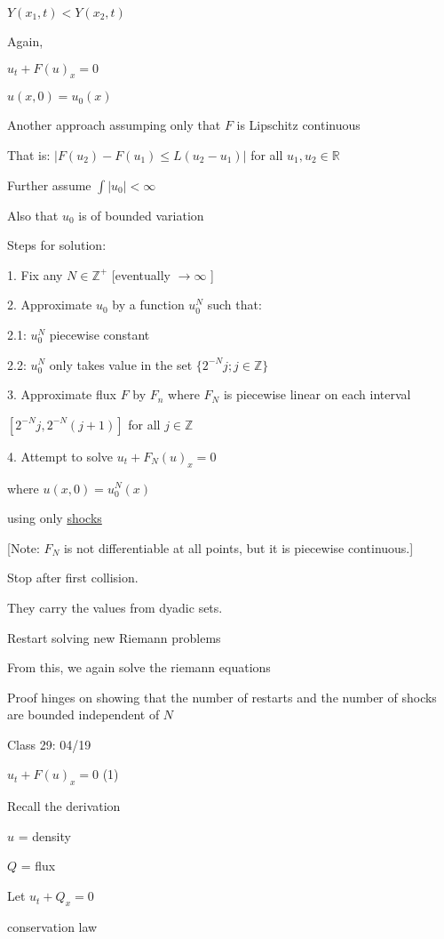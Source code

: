 \documentclass{article}
\theoremstyle{definition}
\begin{document}
\(Y(x_1,t) < Y(x_2,t)\) 

Again,

\(u_t + F(u)_x = 0\) 

\(u(x,0)=u_0(x)\) 

Another approach assumping only that \(F\) is Lipschitz continuous

That is: \(\vert F(u_2) - F(u_1) \leq L(u_2 - u_1) \vert \) for all \(u_1, u_2\in\mathbb{R}\) 

Further assume \(\int \vert u_0 \vert < \infty\) 

Also that \(u_0\) is of bounded variation

Steps for solution:

1. Fix any \(N\in\mathbb{Z} ^+\) [eventually \(\to \infty\) ] 

2. Approximate \(u_0\) by a function \(u_0^N\) such that:

2.1: \(u_0^N\) piecewise constant

2.2: \(u_0^N\) only takes value in the set \(\{ 2^{-N} j ; j\in\mathbb{Z} \} \) 

3. Approximate flux \(F\) by \(F_n\) where \(F_N\) is piecewise linear on each interval

\([2^{-N}j, 2^{-N}(j+1)]\) for all \(j\in\mathbb{Z}\)  

4. Attempt to solve \(u_t + F_N(u)_x = 0\) 

where \(u(x,0)=u_0^N (x)\) 

using only \underline{shocks}

[Note: \(F_N\) is not differentiable at all points, but it is piecewise continuous.]

Stop after first collision.

They carry the values from dyadic sets.

Restart solving new Riemann problems 

From this, we again solve the riemann equations

Proof hinges on showing that the number of restarts and the number of shocks are bounded independent of \(N\) 

\hrulefill

Class 29: 04/19

\(u_t + F(u)_x = 0\)  (1)

Recall the derivation

\(u\) = density

\(Q\) = flux

Let \(u_t + Q_x = 0\) 

conservation law
\end{document}

